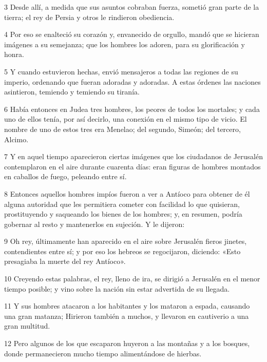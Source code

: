 \par 3 Desde allí, a medida que sus asuntos cobraban fuerza, sometió gran parte de la tierra; el rey de Persia y otros le rindieron obediencia.

\par 4 Por eso se enalteció su corazón y, envanecido de orgullo, mandó que se hicieran imágenes a su semejanza; que los hombres los adoren, para su glorificación y honra.

\par 5 Y cuando estuvieron hechas, envió mensajeros a todas las regiones de su imperio, ordenando que fueran adoradas y adoradas. A estas órdenes las naciones asintieron, temiendo y temiendo su tiranía.

\par 6 Había entonces en Judea tres hombres, los peores de todos los mortales; y cada uno de ellos tenía, por así decirlo, una conexión en el mismo tipo de vicio. El nombre de uno de estos tres era Menelao; del segundo, Simeón; del tercero, Alcimo.

\par 7 Y en aquel tiempo aparecieron ciertas imágenes que los ciudadanos de Jerusalén contemplaron en el aire durante cuarenta días: eran figuras de hombres montados en caballos de fuego, peleando entre sí.

\par 8 Entonces aquellos hombres impíos fueron a ver a Antíoco para obtener de él alguna autoridad que les permitiera cometer con facilidad lo que quisieran, prostituyendo y saqueando los bienes de los hombres; y, en resumen, podría gobernar al resto y mantenerlos en sujeción. Y le dijeron:

\par 9 Oh rey, últimamente han aparecido en el aire sobre Jerusalén fieros jinetes, contendientes entre sí; y por eso los hebreos se regocijaron, diciendo: «Esto presagiaba la muerte del rey Antíoco».

\par 10 Creyendo estas palabras, el rey, lleno de ira, se dirigió a Jerusalén en el menor tiempo posible; y vino sobre la nación sin estar advertida de su llegada.

\par 11 Y sus hombres atacaron a los habitantes y los mataron a espada, causando una gran matanza; Hirieron también a muchos, y llevaron en cautiverio a una gran multitud.

\par 12 Pero algunos de los que escaparon huyeron a las montañas y a los bosques, donde permanecieron mucho tiempo alimentándose de hierbas.

